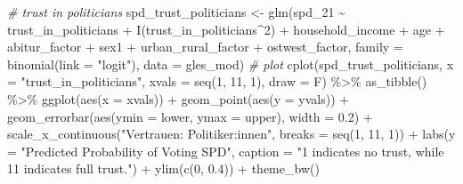 \documentclass[
]{article}
\newenvironment{Shaded}{\begin{snugshade}}{\end{snugshade}}
\newcommand{\AttributeTok}[1]{\textcolor[rgb]{0.77,0.63,0.00}{#1}}
\newcommand{\CommentTok}[1]{\textcolor[rgb]{0.56,0.35,0.01}{\textit{#1}}}
\newcommand{\DecValTok}[1]{\textcolor[rgb]{0.00,0.00,0.81}{#1}}
\newcommand{\FloatTok}[1]{\textcolor[rgb]{0.00,0.00,0.81}{#1}}
\newcommand{\FunctionTok}[1]{\textcolor[rgb]{0.00,0.00,0.00}{#1}}
\newcommand{\NormalTok}[1]{#1}
\newcommand{\OtherTok}[1]{\textcolor[rgb]{0.56,0.35,0.01}{#1}}
\newcommand{\SpecialCharTok}[1]{\textcolor[rgb]{0.00,0.00,0.00}{#1}}
\newcommand{\StringTok}[1]{\textcolor[rgb]{0.31,0.60,0.02}{#1}}
\begin{document}
\begin{Shaded}
\begin{Highlighting}[]
\CommentTok{\# trust in politicians}
\NormalTok{spd\_trust\_politicians }\OtherTok{\textless{}{-}} \FunctionTok{glm}\NormalTok{(spd\_21 }\SpecialCharTok{\textasciitilde{}}\NormalTok{ trust\_in\_politicians }\SpecialCharTok{+} \FunctionTok{I}\NormalTok{(trust\_in\_politicians}\SpecialCharTok{\^{}}\DecValTok{2}\NormalTok{) }\SpecialCharTok{+}\NormalTok{ household\_income }\SpecialCharTok{+}\NormalTok{ age }\SpecialCharTok{+}\NormalTok{ abitur\_factor }\SpecialCharTok{+}\NormalTok{ sex1 }\SpecialCharTok{+}\NormalTok{ urban\_rural\_factor }\SpecialCharTok{+}\NormalTok{ ostwest\_factor, }\AttributeTok{family =} \FunctionTok{binomial}\NormalTok{(}\AttributeTok{link =} \StringTok{"logit"}\NormalTok{), }\AttributeTok{data =}\NormalTok{ gles\_mod)}
\CommentTok{\# plot }
\FunctionTok{cplot}\NormalTok{(spd\_trust\_politicians, }\AttributeTok{x =} \StringTok{"trust\_in\_politicians"}\NormalTok{,}
      \AttributeTok{xvals =} \FunctionTok{seq}\NormalTok{(}\DecValTok{1}\NormalTok{, }\DecValTok{11}\NormalTok{, }\DecValTok{1}\NormalTok{), }\AttributeTok{draw =}\NormalTok{ F) }\SpecialCharTok{\%\textgreater{}\%}
  \FunctionTok{as\_tibble}\NormalTok{() }\SpecialCharTok{\%\textgreater{}\%}
  \FunctionTok{ggplot}\NormalTok{(}\FunctionTok{aes}\NormalTok{(}\AttributeTok{x =}\NormalTok{ xvals)) }\SpecialCharTok{+}
  \FunctionTok{geom\_point}\NormalTok{(}\FunctionTok{aes}\NormalTok{(}\AttributeTok{y =}\NormalTok{ yvals)) }\SpecialCharTok{+}
  \FunctionTok{geom\_errorbar}\NormalTok{(}\FunctionTok{aes}\NormalTok{(}\AttributeTok{ymin =}\NormalTok{ lower, }\AttributeTok{ymax =}\NormalTok{ upper), }\AttributeTok{width =} \FloatTok{0.2}\NormalTok{) }\SpecialCharTok{+}
  \FunctionTok{scale\_x\_continuous}\NormalTok{(}\StringTok{"Vertrauen: Politiker:innen"}\NormalTok{, }
                     \AttributeTok{breaks =} \FunctionTok{seq}\NormalTok{(}\DecValTok{1}\NormalTok{, }\DecValTok{11}\NormalTok{, }\DecValTok{1}\NormalTok{)) }\SpecialCharTok{+}
  \FunctionTok{labs}\NormalTok{(}\AttributeTok{y =} \StringTok{"Predicted Probability of Voting SPD"}\NormalTok{, }
       \AttributeTok{caption =} \StringTok{"\textquotesingle{}1\textquotesingle{} indicates \textquotesingle{}no trust\textquotesingle{}, while 11 indicates \textquotesingle{}full trust\textquotesingle{}."}\NormalTok{) }\SpecialCharTok{+}
  \FunctionTok{ylim}\NormalTok{(}\FunctionTok{c}\NormalTok{(}\DecValTok{0}\NormalTok{, }\FloatTok{0.4}\NormalTok{)) }\SpecialCharTok{+}
  \FunctionTok{theme\_bw}\NormalTok{()}
\end{Highlighting}
\end{Shaded}
\end{document}

